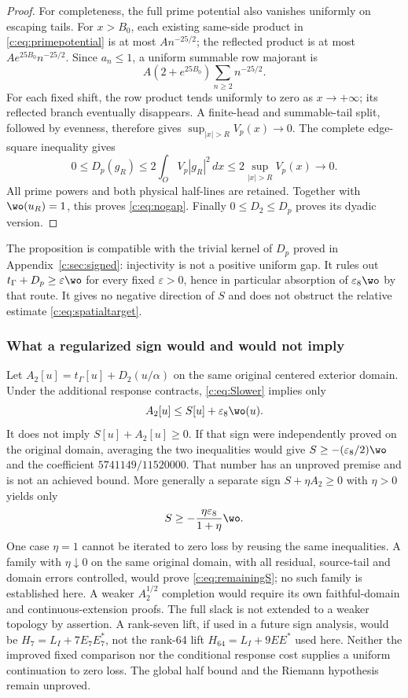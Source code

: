 \documentclass[11pt,a4paper]{article}
\numberwithin{equation}{section}
\theoremstyle{definition}\newtheorem{definition}[theorem]{Definition}
\theoremstyle{remark}\newtheorem{remark}[theorem]{Remark}
\newcommand{\tg}{t_\Gamma}\newcommand{\cg}{c_\Gamma}
\begin{document}
\begin{proof}
For completeness, the full prime potential also vanishes uniformly on escaping tails.
For $x>{B_0}$, each existing same-side product in \eqref{c:eq:primepotential} is at most $An^{-25/2}$; the reflected product is at most $Ae^{25{B_0}}n^{-25/2}$.
Since $a_n\le1$, a uniform summable row majorant is
\[
 A(2+e^{25{B_0}})\sum_{n\ge2}n^{-25/2}.
\]
For each fixed shift, the row product tends uniformly to zero as $x\to+\infty$; its reflected branch eventually disappears.
A finite-head and summable-tail split, followed by evenness, therefore gives
$\sup_{|x|>R}V_p(x)\to0$.
The complete edge-square inequality gives
\[
 0\le D_p(g_R)\le2\int_OV_p|g_R|^2\,dx
 \le2\sup_{|x|>R}V_p(x)\longrightarrow0.
\]
All prime powers and both physical half-lines are retained.
Together with $\wo(u_R)=1$, this proves \eqref{c:eq:nogap}.
Finally $0\le D_2\le D_p$ proves its dyadic version.
\end{proof}
The proposition is compatible with the trivial kernel of $D_p$ proved in Appendix~\ref{c:sec:signed}: injectivity is not a positive uniform gap.
It rules out $\tg+D_p\ge\varepsilon\wo$ for every fixed $\varepsilon>0$, hence in particular absorption of $\varepsilon_8\wo$ by that route.
It gives no negative direction of $S$ and does not obstruct the relative estimate \eqref{c:eq:spatialtarget}.

\subsubsection{What a regularized sign would and would not imply}
Let $A_2[u]=\tg[u]+D_2(u/\alpha)$ on the same original centered exterior domain.
Under the additional response contracts, \eqref{c:eq:Slower} implies only
\[
 A_2[u]\le S[u]+\varepsilon_8\wo(u).
\]
It does not imply $S[u]+A_2[u]\ge0$.
If that sign were independently proved on the original domain, averaging the two inequalities would give
$S\ge-(\varepsilon_8/2)\wo$ and the coefficient $5741149/11520000$.
That number has an unproved premise and is not an achieved bound.
More generally a separate sign $S+\eta A_2\ge0$ with $\eta>0$ yields only
\[
 S\ge-\frac{\eta\varepsilon_8}{1+\eta}\wo.
\]
One case $\eta=1$ cannot be iterated to zero loss by reusing the same inequalities.
A family with $\eta\downarrow0$ on the same original domain, with all residual, source-tail and domain errors controlled, would prove \eqref{c:eq:remainingS}; no such family is established here.
A weaker $A_2^{1/2}$ completion would require its own faithful-domain and continuous-extension proofs. The full slack is not extended to a weaker topology by assertion.
A rank-seven lift, if used in a future sign analysis, would be $H_7=L_I+7E_7E_7^*$, not the rank-64 lift $H_{64}=L_I+9EE^*$ used here.
Neither the improved fixed comparison nor the conditional response cost supplies a uniform continuation to zero loss.
The global half bound and the Riemann hypothesis remain unproved.
\end{document}
